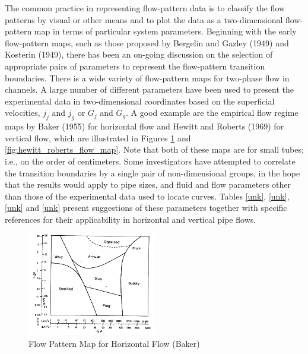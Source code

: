 The common practice in representing flow-pattern data is to classify the flow patterns by visual or other means and to plot the data as a two-dimensional flow-pattern map in terms of particular system parameters.
Beginning with the early flow-pattern maps, such as those proposed by Bergelin and Gazley (1949) and Kosterin (1949), there has been an on-going discussion on the selection of appropriate pairs of parameters to represent the flow-pattern transition boundaries.
There is a wide variety of flow-pattern maps for two-phase flow in channels.
A large number of different parameters have been used to present the experimental data in two-dimensional coordinates based on the superficial velocities, $j_j$ and $j_g$ or $G_j$ and $G_g$.
A good example are the empirical flow regime maps by Baker (1955) for horizontal flow and Hewitt and Roberts (1969) for vertical flow, which are illustrated in Figures \ref{fig:baker_flow_map} and \ref{fig:hewitt_roberts_flow_map}.
Note that both of these maps are for small tubes; i.e., on the order of centimeters.
Some investigators have attempted to correlate the transition boundaries by a single pair of non-dimensional groups, in the hope that the results would apply to pipe sizes, and fluid and flow parameters other than those of the experimental data used to locate curves.
Tables \ref{unk}, \ref{unk}, \ref{unk} and \ref{unk} present suggestions of these parameters together with specific references for their applicability in horizontal and vertical pipe flows.

\begin{figure}[h]
\includegraphics[width=0.5\textwidth]{images/baker_flow_map.png}
\caption{Flow Pattern Map for Horizontal Flow (Baker)}
\label{fig:baker_flow_map}
\end{figure}


